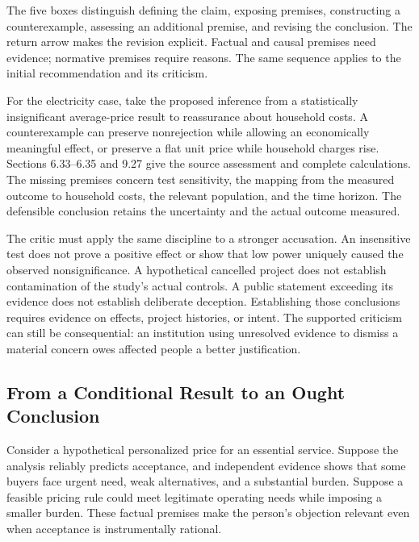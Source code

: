 The five boxes distinguish defining the claim, exposing premises,
constructing a counterexample, assessing an additional premise, and
revising the conclusion. The return arrow makes the revision explicit.
Factual and causal premises need evidence; normative premises require
reasons. The same sequence applies to the initial recommendation and its
criticism.

For the electricity case, take the proposed inference from a
statistically insignificant average-price result to reassurance about
household costs. A counterexample can preserve nonrejection while
allowing an economically meaningful effect, or preserve a flat unit
price while household charges rise. Sections 6.33--6.35 and 9.27 give
the source assessment and complete calculations. The missing premises
concern test sensitivity, the mapping from the measured outcome to
household costs, the relevant population, and the time horizon. The
defensible conclusion retains the uncertainty and the actual outcome
measured.

The critic must apply the same discipline to a stronger accusation. An
insensitive test does not prove a positive effect or show that low power
uniquely caused the observed nonsignificance. A hypothetical cancelled
project does not establish contamination of the study's actual controls.
A public statement exceeding its evidence does not establish deliberate
deception. Establishing those conclusions requires evidence on effects,
project histories, or intent. The supported criticism can still be
consequential: an institution using unresolved evidence to dismiss a
material concern owes affected people a better justification.

\hypertarget{M09-from-a-conditional-result-to-an-ought-conclusion}{%
\subsection{From a Conditional Result to an Ought
Conclusion}\label{M09-from-a-conditional-result-to-an-ought-conclusion}}

\noindent \noindent Consider a hypothetical personalized price for an essential
service. Suppose the analysis reliably predicts acceptance, and
independent evidence shows that some buyers face urgent need, weak
alternatives, and a substantial burden. Suppose a feasible pricing rule
could meet legitimate operating needs while imposing a smaller burden.
These factual premises make the person's objection relevant even when
acceptance is instrumentally rational.

